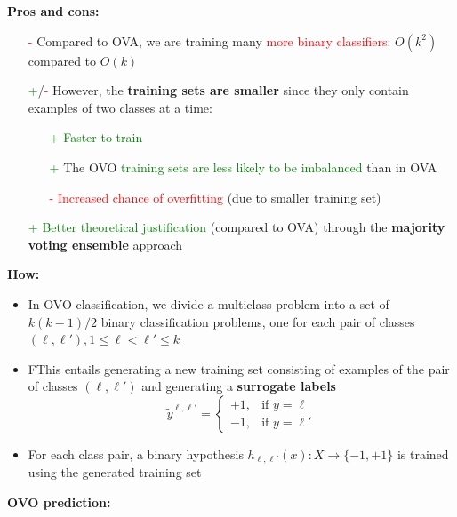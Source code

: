 \documentclass[12pt, a4paper]{article}
\begin{document}
\textbf{Pros and cons:}
\begin{itemize}
  \item[\textcolor{red}{-}] Compared to OVA, we are training many \textcolor{red}{more binary classifiers}: $O(k^2)$ compared to $O(k)$
  \item[\textcolor{Green}{+}/\textcolor{red}{-}] However, the \textbf{training sets are smaller} since they only contain examples of two classes at a time:
  \begin{itemize}
    \item[\textcolor{Green}{+}] \textcolor{Green}{Faster to train}
    \item[\textcolor{Green}{+}] The OVO \textcolor{Green}{training sets are less likely to be imbalanced} than in OVA
    \item[\textcolor{red}{-}] \textcolor{red}{Increased chance of overfitting} (due to smaller training set)
  \end{itemize}
  \item[\textcolor{Green}{+}] \textcolor{Green}{Better theoretical justification} (compared to OVA) through the \textbf{majority voting ensemble} approach
\end{itemize}



\textbf{How:}

\begin{itemize}
  \item In OVO classification, we divide a multiclass problem into a set of $k(k - 1)/2$ binary classification problems, one for each pair of classes $(\ell,\ell'),1 \leq \ell < \ell ' \leq k$
  \item FThis entails generating a new training set consisting of examples of the pair of classes $(\ell,\ell')$ and generating a \textbf{surrogate labels}
  $$
  \tilde{y}^{\ell, \ell'} =
  \begin{cases}
	+1, & \text{if $y = \ell$} \\
  -1, & \text{if $y = \ell'$}
	\end{cases}
  $$
  \item For each class pair, a binary hypothesis $h_{\ell,\ell'}(x) : X \to \{-1, +1\}$ is trained using the generated training set
\end{itemize}



\textbf{OVO prediction:}
\end{document}
